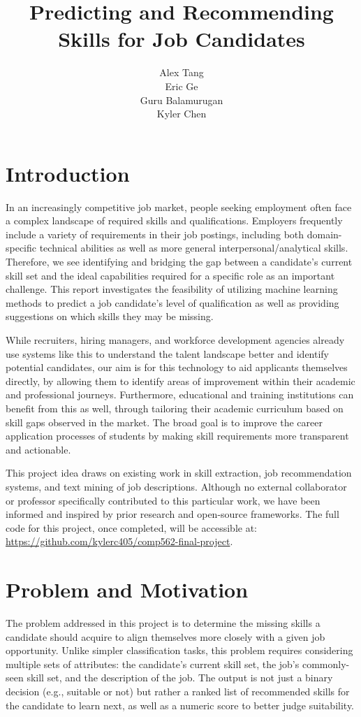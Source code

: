 \documentclass[11pt]{article}
\title{Predicting and Recommending Skills for Job Candidates}
\author{Alex Tang \\
Eric Ge \\ 
Guru Balamurugan \\ 
Kyler Chen \\
}
\date{}
\begin{document}
\maketitle

\section{Introduction}
In an increasingly competitive job market, people seeking employment often face a complex landscape of required skills and qualifications. Employers frequently include a variety of requirements in their job postings, including both domain-specific technical abilities as well as more general interpersonal/analytical skills. Therefore, we see identifying and bridging the gap between a candidate's current skill set and the ideal capabilities required for a specific role as an important challenge. This report investigates the feasibility of utilizing machine learning methods to predict a job candidate's level of qualification as well as providing suggestions on which skills they may be missing. 

While recruiters, hiring managers, and workforce development agencies already use systems like this to understand the talent landscape better and identify potential candidates, our aim is for this technology to aid applicants themselves directly, by allowing them to identify areas of improvement within their academic and professional journeys. Furthermore, educational and training institutions can benefit from this as well, through tailoring their academic curriculum based on skill gaps observed in the market. The broad goal is to improve the career application processes of students by making skill requirements more transparent and actionable. 

This project idea draws on existing work in skill extraction, job recommendation systems, and text mining of job descriptions. Although no external collaborator or professor specifically contributed to this particular work, we have been informed and inspired by prior research and open-source frameworks. The full code for this project, once completed, will be accessible at: \url{https://github.com/kylerc405/comp562-final-project}.

\section{Problem and Motivation}
The problem addressed in this project is to determine the missing skills a candidate should acquire to align themselves more closely with a given job opportunity. Unlike simpler classification tasks, this problem requires considering multiple sets of attributes: the candidate’s current skill set, the job’s commonly-seen skill set, and the description of the job. The output is not just a binary decision (e.g., suitable or not) but rather a ranked list of recommended skills for the candidate to learn next, as well as a numeric score to better judge suitability. 
\end{document}
